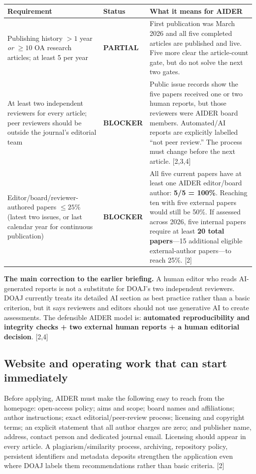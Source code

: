 \documentclass[11pt]{article}
\newcommand{\src}[1]{{\footnotesize\color{ink3}[#1]}}
\newcommand{\partialx}{\colorbox{amberbg}{\textcolor{amber}{\sffamily\scriptsize\bfseries PARTIAL}}}
\newcommand{\atrisk}{\colorbox{amberbg}{\textcolor{redx}{\sffamily\scriptsize\bfseries BLOCKER}}}
\begin{document}
{\small\renewcommand{\arraystretch}{1.22}
\begin{tabular}{@{}p{4.1cm} p{1.6cm} p{8.4cm}@{}}
\toprule
\textbf{Requirement} & \textbf{Status} & \textbf{What it means for AIDER} \\
\midrule
Publishing history $>1$ year \emph{or} $\geq10$ OA research articles; at least 5 per year & \partialx & First publication was March 2026 and all five completed articles are published and live. Five more clear the article-count gate, but do not solve the next two gates. \\
\addlinespace
At least two independent reviewers for every article; peer reviewers should be outside the journal's editorial team & \atrisk & Public issue records show the five papers received one or two human reports, but those reviewers were AIDER board members. Automated/AI reports are explicitly labelled ``not peer review.'' The process must change before the next article. \src{2,3,4} \\
\addlinespace
Editor/board/reviewer-authored papers $\leq25\%$ (latest two issues, or last calendar year for continuous publication) & \atrisk & All five current papers have at least one AIDER editor/board author: \textbf{5/5 = 100\%}. Reaching ten with five external papers would still be 50\%. If assessed across 2026, five internal papers require at least \textbf{20 total papers}---15 additional eligible external-author papers---to reach 25\%. \src{2} \\
\bottomrule
\end{tabular}}

\begin{warnbox}
\textbf{The main correction to the earlier briefing.} A human editor who reads AI-generated reports is not a substitute for DOAJ's two independent reviewers. DOAJ currently treats its detailed AI section as best practice rather than a basic criterion, but it says reviewers and editors should not use generative AI to create assessments. The defensible AIDER model is: \textbf{automated reproducibility and integrity checks + two external human reports + a human editorial decision}. \src{2,4}
\end{warnbox}

\subsection{Website and operating work that can start immediately}

Before applying, AIDER must make the following easy to reach from the homepage: open-access policy; aims and scope; board names and affiliations; author instructions; exact editorial/peer-review process; licensing and copyright terms; an explicit statement that all author charges are zero; and publisher name, address, contact person and dedicated journal email. Licensing should appear in every article. A plagiarism/similarity process, archiving, repository policy, persistent identifiers and metadata deposits strengthen the application even where DOAJ labels them recommendations rather than basic criteria. \src{2}
\end{document}
